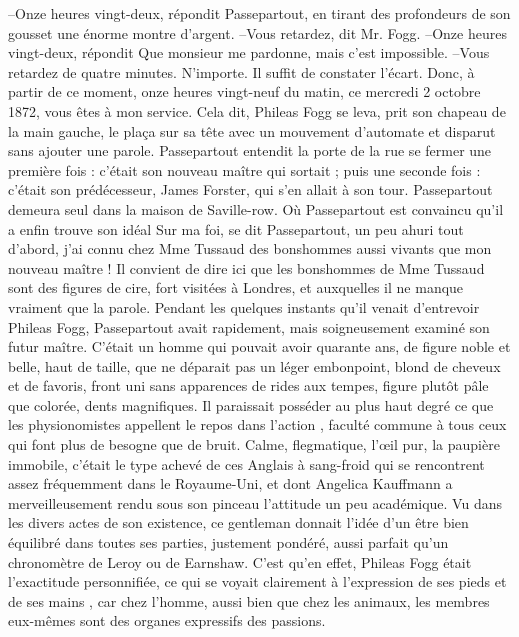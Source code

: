 \documentclass[12pt,a4paper,openany]{book}
\begin{document}
                –Onze heures vingt-deux, répondit Passepartout, en tirant des profondeurs de son gousset une énorme montre d’argent.
                –Vous retardez, dit Mr. Fogg.
                –Onze heures vingt-deux, répondit Que monsieur me pardonne, mais c’est impossible.
                –Vous retardez de quatre minutes. N’importe. Il suffit de constater l’écart. Donc, à partir de ce moment, onze heures vingt-neuf du matin, ce mercredi 2 octobre 1872, vous êtes à mon service. \fg
                Cela dit, Phileas Fogg se leva, prit son chapeau de la main gauche, le plaça sur sa tête avec un mouvement d’automate et disparut sans ajouter une parole.
                Passepartout entendit la porte de la rue se fermer une première fois : c’était son nouveau maître qui sortait ; puis une seconde fois : c’était son prédécesseur, James Forster\index[persName]{}, qui s’en allait à son tour.
                Passepartout demeura seul dans la maison de Saville-row.
                Où Passepartout est convaincu qu’il a enfin trouve son idéal
                \og Sur ma foi, se dit Passepartout, un peu ahuri tout d’abord, j’ai connu chez Mme Tussaud des bonshommes aussi vivants que mon nouveau maître ! \fg
                Il convient de dire ici que les \og bonshommes \fg de Mme Tussaud sont des figures de cire, fort visitées à Londres, et auxquelles il ne manque vraiment que la parole.
                Pendant les quelques instants qu’il venait d’entrevoir Phileas Fogg, Passepartout avait rapidement, mais soigneusement examiné son futur maître. C’était un homme qui pouvait avoir quarante ans, de figure noble et belle, haut de taille, que ne déparait pas un léger embonpoint, blond de cheveux et de favoris, front uni sans apparences de rides aux tempes, figure plutôt pâle que colorée, dents magnifiques. Il paraissait posséder au plus haut degré ce que les physionomistes appellent \og le repos dans l’action \fg, faculté commune à tous ceux qui font plus de besogne que de bruit. Calme, flegmatique, l’œil pur, la paupière immobile, c’était le type achevé de ces Anglais à sang-froid qui se rencontrent assez fréquemment dans le Royaume-Uni, et dont Angelica Kauffmann a merveilleusement rendu sous son pinceau l’attitude un peu académique. Vu dans les divers actes de son existence, ce gentleman donnait l’idée d’un être bien équilibré dans toutes ses parties, justement pondéré, aussi parfait qu’un chronomètre de Leroy ou de Earnshaw. C’est qu’en effet, Phileas Fogg était l’exactitude personnifiée, ce qui se voyait clairement à \og l’expression de ses pieds et de ses mains \fg, car chez l’homme, aussi bien que chez les animaux, les membres eux-mêmes sont des organes expressifs des passions.
\end{document}
